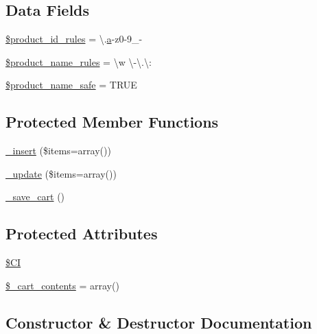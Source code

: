 \subsection*{Data Fields}
\begin{DoxyCompactItemize}
\item 
\hyperlink{class_c_i___cart_aef9fb0bb2a9ab37008d77ed80b7b122b}{\$product\+\_\+id\+\_\+rules} = \textquotesingle{}\textbackslash{}.\hyperlink{bootstrap_8min_8js_a1f5870dcf487187f13d5fd328ed9e6e7}{a}-\/z0-\/9\+\_\+-\/\textquotesingle{}
\item 
\hyperlink{class_c_i___cart_afdc2e791be5e676e94580a0d9ed63ebf}{\$product\+\_\+name\+\_\+rules} = \textquotesingle{}\textbackslash{}w \textbackslash{}-\/\textbackslash{}.\textbackslash{}\+:\textquotesingle{}
\item 
\hyperlink{class_c_i___cart_afefced563284b97869b3d35053857362}{\$product\+\_\+name\+\_\+safe} = T\+R\+U\+E
\end{DoxyCompactItemize}
\subsection*{Protected Member Functions}
\begin{DoxyCompactItemize}
\item 
\hyperlink{class_c_i___cart_a55d27979573b7d46bdf774f247c15b07}{\+\_\+insert} (\$items=array())
\item 
\hyperlink{class_c_i___cart_ac7b19afff2357d4b9e926ee2df1f3e65}{\+\_\+update} (\$items=array())
\item 
\hyperlink{class_c_i___cart_abaa559f3e9e7f8ad933f19165fb61083}{\+\_\+save\+\_\+cart} ()
\end{DoxyCompactItemize}
\subsection*{Protected Attributes}
\begin{DoxyCompactItemize}
\item 
\hyperlink{class_c_i___cart_ae0314d046ddf7fcfaec03222977427d3}{\$\+C\+I}
\item 
\hyperlink{class_c_i___cart_a93aff4174af6004d8cc7a51bf0c59632}{\$\+\_\+cart\+\_\+contents} = array()
\end{DoxyCompactItemize}


\subsection{Constructor \& Destructor Documentation}
\hypertarget{class_c_i___cart_a568ecdb0d73d2a870f33189739922a50}{}
